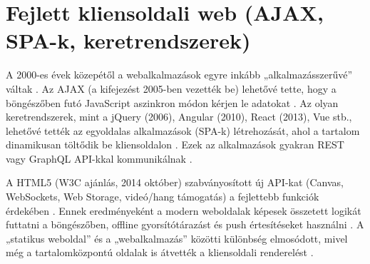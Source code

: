 \section{Fejlett kliensoldali web (AJAX, SPA-k, keretrendszerek)}
A 2000-es évek közepétől a webalkalmazások egyre inkább „alkalmazásszerűvé” váltak \cite{mdnClientFrameworks}. Az AJAX (a kifejezést 2005-ben vezették be) lehetővé tette, hogy a böngészőben futó JavaScript aszinkron módon kérjen le adatokat \cite{garrett2005ajax,mdnAjax}. Az olyan keretrendszerek, mint a jQuery (2006), Angular (2010), React (2013), Vue stb., lehetővé tették az egyoldalas alkalmazások (SPA-k) létrehozását, ahol a tartalom dinamikusan töltődik be kliensoldalon \cite{mdnSpa,mdnClientFrameworks}. Ezek az alkalmazások gyakran REST vagy GraphQL API-kkal kommunikálnak \cite{fielding2000rest,graphql2021spec}.

A HTML5 (W3C ajánlás, 2014 október) szabványosított új API-kat (Canvas, WebSockets, Web Storage, videó/hang támogatás) a fejlettebb funkciók érdekében \cite{w3c2014html5,fette2011websocket,w3c2013webstorage}. Ennek eredményeként a modern weboldalak képesek összetett logikát futtatni a böngészőben, offline gyorsítótárazást és push értesítéseket használni \cite{mdnPwaOfflineBackground}. A „statikus weboldal” és a „webalkalmazás” közötti különbség elmosódott, mivel még a tartalomközpontú oldalak is átvették a kliensoldali renderelést \cite{webdevClientSideRendering,mdnClientFrameworks}.
